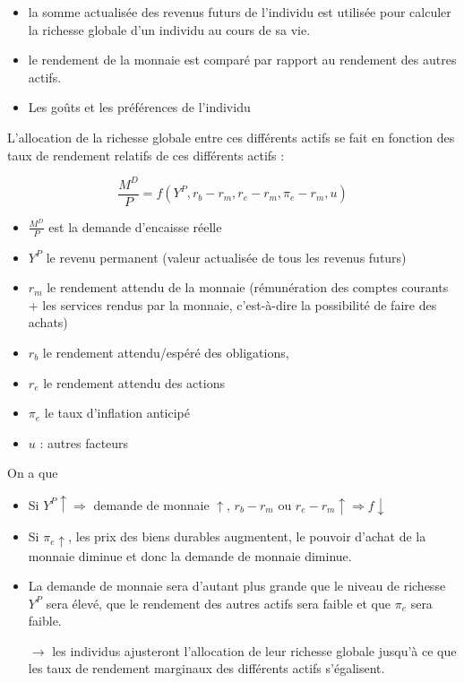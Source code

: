 	\begin{itemize}
		\item la somme actualisée des revenus futurs de l'individu est utilisée pour calculer la richesse globale d'un individu au cours de sa vie.
		\item le rendement de la monnaie est comparé par rapport au rendement des autres actifs.
		\item Les goûts et les préférences de l'individu
	\end{itemize}
	
	L'allocation de la richesse globale entre ces différents actifs se fait en fonction des taux de rendement relatifs de ces différents actifs :
	
	$$\frac{M^D}{P} = f(Y^P, r_b - r_m, r_e - r_m,\pi_e - r_m, u)$$
	
	\begin{itemize}
		\item $\frac{M^D}{P}$ est la demande d'encaisse réelle
		\item  $Y^P$ le revenu permanent (valeur actualisée de tous les revenus futurs)
		\item $r_m$ le rendement attendu de la monnaie (rémunération des comptes courants + les services rendus par la monnaie, c'est-à-dire la possibilité de faire des achats)
		\item $r_b$ le rendement attendu/espéré des obligations,
		\item $r_e$ le rendement attendu des actions
		\item $\pi_e$  le taux d'inflation anticipé
		\item $u$ : autres facteurs
	\end{itemize}
	
	On a que
	
	\begin{itemize}
		\item Si $Y^P \uparrow \Rightarrow$ demande de monnaie $\uparrow$, $r_b - r_m$ ou $r_e - r_m \uparrow \Rightarrow f \downarrow$
		\item Si $\pi_e \uparrow$, les prix des biens durables augmentent, le pouvoir d'achat de la monnaie diminue et donc la demande de monnaie diminue.
		
		\item La demande de monnaie sera d'autant plus grande que le niveau de richesse $Y^P$ sera élevé, que le rendement des autres actifs sera faible et que $\pi_e$ sera faible. 
		
		\item[$\rightarrow$] les individus ajusteront l'allocation de leur richesse globale jusqu'à ce que les taux de rendement marginaux des différents actifs s'égalisent.
	\end{itemize}
		
